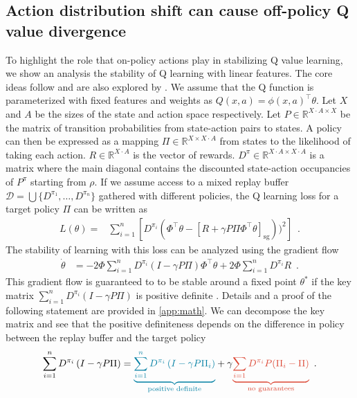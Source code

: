 \subsection{Action distribution shift can cause off-policy Q value divergence}
\label{sec:theory}
To highlight the role that on-policy actions play in stabilizing Q value learning, we show an analysis the stability of Q learning with linear features.
The core ideas follow \textcite{sutton2016emphatic} and are also explored by \textcite{tsitsiklis1996analysis,sutton1988learning}.
We assume that the Q function is parameterized with fixed features and weights as $Q(x,a) = \phi(x,a)^\top \theta$.
Let $X$ and $A$ be the sizes of the state and action space respectively. Let $P \in \mathbb{R}^{X\cdot A \times X}$ be the matrix of transition probabilities from state-action pairs to states.
A policy can then be expressed as a mapping $\Pi \in \mathbb{R}^{X\times X\cdot A}$ from states to the likelihood of taking each action.
$R \in \mathbb{R}^{X\cdot A}$ is the vector of rewards.
$D^{\pi} \in \mathbb{R}^{X\cdot A \times X\cdot A}$ is a matrix where the main diagonal contains the discounted state-action occupancies of $P^\pi$ starting from $\rho$.
If we assume access to a mixed replay buffer $\mathcal{D} = \bigcup \{D^{\pi_1}, \dots, D^{\pi_n}\}$ gathered with different policies, the Q learning loss for a target policy $\Pi$ can be written as
\begin{align}
    L(\theta) = & \sum_{i=1}^n \left[D^{\pi_i}\left(\Phi^\top \theta - [R + \gamma P\Pi \Phi^\top \theta]_\mathrm{sg}\right))^2\right] \enspace.
\end{align}
The stability of learning with this loss can be analyzed using the gradient flow
    \begin{align}
    \dot{\theta} &= - 2 \Phi \sum_{i=1}^n D^{\pi_i} \left(I - \gamma P\Pi \right)\Phi^\top \theta + 2 \Phi \sum_{i=1}^n D^{\pi_i} R \enspace.
\end{align}
This gradient flow is guaranteed to to be stable around a fixed point $\theta^*$ if the key matrix $\sum_{i=1}^n D^{\pi_i} \left(I - \gamma P \Pi \right)$ is positive definite \parencite{sutton1988learning}. 
Details and a proof of the following statement are provided in \autoref{app:math}.
We can decompose the key matrix and see that the positive definiteness depends on the difference in policy between the replay buffer and the target policy
\begin{align}
    \sum_{i=1}^n D^{\pi_i} \left(I - \gamma P\Pi \right) = \blue{\underbrace{\sum_{i=1}^n D^{\pi_i} \left(I - \gamma P\Pi_i \right)}_{\text{positive definite}}} + \gamma \red{\underbrace{\sum_{i=1} D^{\pi_i}P (\Pi_i - \Pi)}_{\text{no guarantees}}} \enspace .
\end{align}
